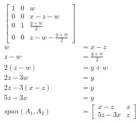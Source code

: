 \documentclass[letterpaper, 12pt]{math}
\begin{document}
\begin{align*}
\begin{bmatrix}
    1 & 0 & w \\
    0 & 0 & x-z-w \\
    0 & 1 & \frac{y+w}{2} \\
    0 & 0 & z-w-\frac{y+w}{2}
  \end{bmatrix} \\
  w &= x-z \\
  z-w &= \frac{y+w}{2} \\
  2(z-w) &= y+w \\
  2z-3w &= y \\
  2z-3(x-z) &= y \\
  5z-3x &= y \\
  span(A_1,A_2) &= \begin{bmatrix}
    x-z & x \\
    5z-3x & z
  \end{bmatrix}
\end{align*}
\end{document}
